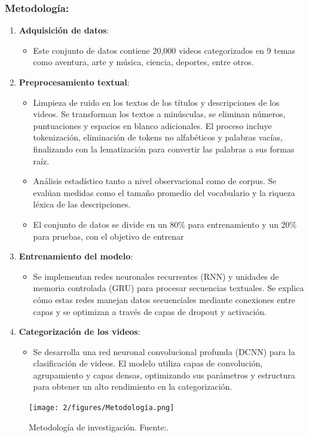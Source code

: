 \subsubsection {Metodología: }
	\begin{enumerate}
		\item \textbf{Adquisición de datos}: 
		\begin{itemize}
			\item Este conjunto de datos contiene 20,000 videos categorizados en 9 temas como aventura, arte y música, ciencia, deportes, entre otros.
		\end{itemize}
		
		\item \textbf{Preprocesamiento textual}:
		\begin{itemize}
			\item Limpieza de ruido en los textos de los títulos y descripciones de los videos. Se transforman los textos a minúsculas, se eliminan números, puntuaciones y espacios en blanco adicionales. El proceso incluye tokenización, eliminación de tokens no alfabéticos y palabras vacías, finalizando con la lematización para convertir las palabras a sus formas raíz.
			\item Análisis estadístico tanto a nivel observacional como de corpus. Se evalúan medidas como el tamaño promedio del vocabulario y la riqueza léxica de las descripciones.
			\item  El conjunto de datos se divide en un 80\% para entrenamiento y un 20\% para pruebas, con el objetivo de entrenar
		\end{itemize}
		
		\item \textbf{Entrenamiento del modelo}:
		\begin{itemize}
			\item Se implementan redes neuronales recurrentes (RNN) y unidades de memoria controlada (GRU) para procesar secuencias textuales. Se explica cómo estas redes manejan datos secuenciales mediante conexiones entre capas y se optimizan a través de capas de dropout y activación.
		\end{itemize}
		
		\item \textbf{Categorización de los videos}:
		\begin{itemize}
			\item Se desarrolla una red neuronal convolucional profunda (DCNN) para la clasificación de videos. El modelo utiliza capas de convolución, agrupamiento y capas densas, optimizando sus parámetros y estructura para obtener un alto rendimiento en la categorización.
		\end{itemize}
	\end{enumerate}
	\begin{figure}[H]
		\centering
		\texttt{[image: 2/figures/Metodología.png]}
		\caption{Metodología de investigación. Fuente:\cite {raza2024improved}.}
		\label{fig:etiqueta_de_la_figura}
	\end{figure}

